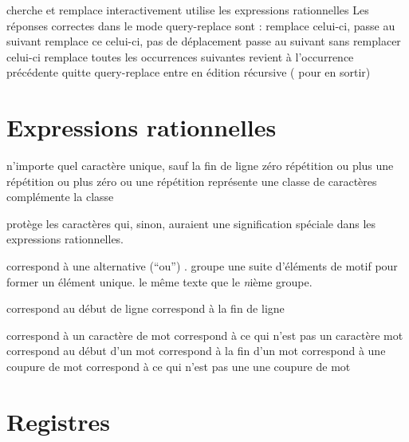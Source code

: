  cherche et remplace interactivement
 utilise les expressions rationnelles
\askip
Les r\'eponses correctes dans le mode query-replace sont :
\askip
{} remplace celui-ci, passe au suivant
\key{,} remplace ce celui-ci, pas de d\'eplacement
 passe au suivant sans remplacer celui-ci
\key{!} remplace toutes les occurrences suivantes
\key{\^{}} revient \`a l'occurrence pr\'ec\'edente
 quitte query-replace
 entre en \'edition r\'ecursive ( pour en sortir)

\section{Expressions rationnelles}

 n'importe quel caract\`ere unique, sauf la fin de ligne
\key{*} z\'ero r\'ep\'etition ou plus
\key{+} une r\'ep\'etition ou plus
 z\'ero ou une r\'ep\'etition
\key{[$\ldots$]} repr\'esente une classe de caract\`eres
\key{[\^{}$\ldots$]} compl\'emente la classe

 prot\`ege les caract\`eres qui, sinon, auraient une
  signification sp\'eciale dans les expressions rationnelles.

\key{$\ldots$\\|$\ldots$\\|$\ldots$} correspond \`a une
alternative (``ou'') .
\key{\\( $\ldots$ \\)} groupe une suite d'\'el\'ements de motif pour
former un \'el\'ement unique.
 le m\^eme texte que le {\it n\/}i\`eme groupe.

\key{\^{}} correspond au d\'ebut de ligne
\key{\$} correspond \`a la fin de ligne

\key{\\w} correspond \`a un caract\`ere de mot
\key{\\W} correspond \`a ce qui n'est pas un caract\`ere mot
\key{\\<} correspond au d\'ebut d'un mot
\key{\\>} correspond \`a la fin d'un mot
\key{\\b} correspond \`a une coupure de mot
\key{\\B} correspond \`a ce qui n'est pas une une coupure de mot

\section{Registres}

